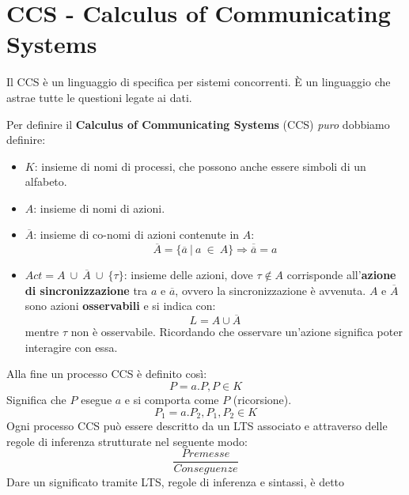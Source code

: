 \section{CCS - Calculus of Communicating Systems}
Il CCS è un linguaggio di specifica per sistemi concorrenti. È un linguaggio che
astrae tutte le questioni legate ai dati.
\begin{definizione}
    Per definire il \textbf{Calculus of Communicating Systems} (CCS) \textit{puro}
    dobbiamo definire:
    \begin{itemize}
        \item  $K$: insieme di nomi di processi, che possono anche essere
              simboli di un alfabeto.
        \item  $A$: insieme di nomi di azioni.
        \item $\overline{A}$: insieme di co-nomi di azioni contenute
              in $A$:
              \begin{equation}
                  \overline{A} = \{\overline{a} \ | \ a \ \in \ A\} \Rightarrow
                  \overline{\overline{a}} = a
              \end{equation}
        \item $Act = A \ \cup  \ \overline{A} \ \cup \ \{\tau\}$: insieme delle
              azioni, dove $\tau \notin A$ corrisponde all'\textbf{azione di
                  sincronizzazione} tra $a$ e $\overline{a}$, ovvero la sincronizzazione
              è avvenuta. $A$ e $\overline{A}$ sono azioni \textbf{osservabili}
              e si indica con: $$L = A \cup \overline{A}$$ mentre $\tau$ non è
              osservabile. Ricordando che osservare un'azione significa poter
              interagire con essa.
    \end{itemize}
\end{definizione}
Alla fine un processo CCS è definito così:
\begin{equation}
    P = a.P, P \in K
\end{equation}
Significa che $P$ esegue $a$ e si comporta come $P$ (ricorsione).
\begin{equation}
    P_1 = a.P_2, P_1, P_2 \in K
\end{equation}
Ogni processo CCS può essere descritto da un LTS associato e attraverso delle
regole di inferenza strutturate nel seguente modo:
\begin{equation}
    \frac{Premesse}{Conseguenze}
\end{equation}
Dare un significato tramite LTS, regole di inferenza e sintassi, è detto
